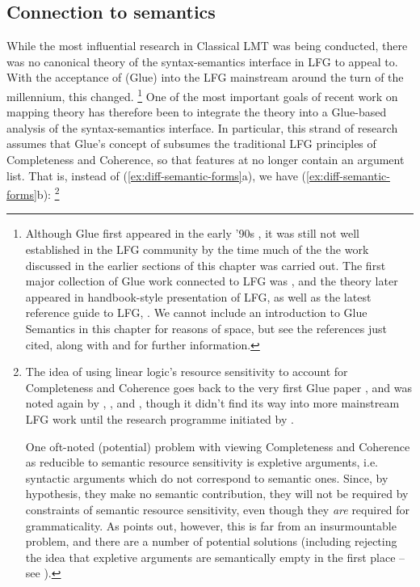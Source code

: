 \documentclass[output=paper]{langscibook}
\begin{document}
\newpage
\subsection{Connection to semantics}\label{sec:argstr:semantics}

While the most influential research in Classical LMT was being conducted, there
was no canonical theory of the syntax-semantics interface in LFG to appeal to.
With the acceptance of  (Glue) into the LFG mainstream around
the turn of the millennium, this changed.%
%
\footnote{Although Glue first appeared in the early '90s
  \citep{dalrympleetal93}, it was still not well established in the LFG
  community by the time much of the the work discussed in the earlier sections
  of this chapter was carried out. The first major collection of Glue work
  connected to LFG was \citet{Dalrymple:Glue}, and the theory later appeared in
   handbook-style presentation of LFG, as well as the
  latest reference guide to LFG, \citet[ch,~8.5]{DLM:LFG}. We cannot include an
  introduction to Glue Semantics in this chapter for reasons of space, but see
  the references just cited, along with \citet{asudeh22} and
   for further information.}
%
One of the most important goals of recent work on mapping theory has therefore
been to integrate the theory into a Glue-based analysis of the syntax-semantics
interface. In particular, this strand of research assumes that Glue's concept of
 \citep[ch.~5]{Asudeh12} subsumes the traditional LFG
principles of Completeness and Coherence, so that \PRED features at \fstruc{} no
longer contain an argument list. That is, instead of
(\ref{ex:diff-semantic-forms}a), we have (\ref{ex:diff-semantic-forms}b):%
%
\footnote{The idea of using linear logic's resource sensitivity to account for
  Completeness and Coherence goes back to the very first Glue paper
  \citep{dalrympleetal93}, and was noted again by
  \citet{dalrymple-etal1999intro}, \citet{kuhn2001}, and
  \citet[112ff.]{Asudeh12}, though it didn't find its way into more mainstream
  LFG work until the research programme initiated by \citet{AsudGior12}.

  One oft-noted (potential) problem with viewing Completeness and Coherence as
  reducible to semantic resource sensitivity is expletive arguments, i.e.
  syntactic arguments which do not correspond to semantic ones. Since, by
  hypothesis, they make no semantic contribution, they will not be required by
  constraints of semantic resource sensitivity, even though they \emph{are}
  required for grammaticality. As \citet[113]{Asudeh12} points out, however,
  this is far from an insurmountable problem, and there are a number of
  potential solutions (including rejecting the idea that expletive arguments are
  semantically empty in the first place -- see \citealt{bolinger1977}).}
%
\end{document}
